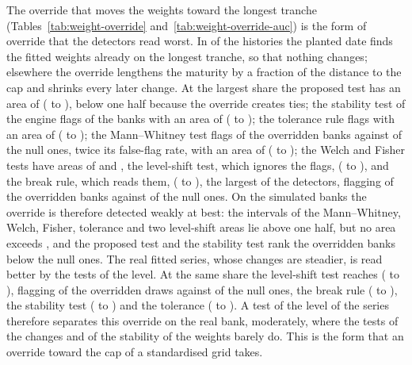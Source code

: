The override that moves the weights toward the longest tranche (Tables~\ref{tab:weight-override} and~\ref{tab:weight-override-auc}) is the form of override that the detectors read worst. In \invisShare{} of the histories the planted date finds the fitted weights already on the longest tranche, so that nothing changes; elsewhere the override lengthens the maturity by a fraction of the distance to the cap and shrinks every later change. At the largest share the proposed test has an area of \wEngineAucHigh{} (\wEngineAucLoHigh{} to \wEngineAucHiHigh{}), below one half because the override creates ties; the stability test of the engine flags \wStabFlagHigh{} of the banks with an area of \wStabAucHigh{} (\wStabAucLoHigh{} to \wStabAucHiHigh{}); the tolerance rule flags \wTolFlagHigh{} with an area of \wTolAucHigh{} (\wTolAucLoHigh{} to \wTolAucHiHigh{}); the Mann--Whitney test flags \wMwFlagHigh{} of the overridden banks against \fitNullMw{} of the null ones, twice its false-flag rate, with an area of \wMwAucHigh{} (\wMwAucLoHigh{} to \wMwAucHiHigh{}); the Welch and Fisher tests have areas of \wWelchAucHigh{} and \wFisherAucHigh{}, the level-shift test, which ignores the flags, \wShiftAucHigh{} (\wShiftAucLoHigh{} to \wShiftAucHiHigh{}), and the break rule, which reads them, \wTopAuc{} (\wTopAucLo{} to \wTopAucHi{}), the largest of the detectors, flagging \wTopFlag{} of the overridden banks against \wTopNull{} of the null ones. On the simulated banks the override is therefore detected weakly at best: the intervals of the Mann--Whitney, Welch, Fisher, tolerance and two level-shift areas lie above one half, but no area exceeds \wTopAuc{}, and the proposed test and the stability test rank the overridden banks below the null ones. The real fitted series, whose changes are steadier, is read better by the tests of the level. At the same share the level-shift test reaches \wRealTopAuc{} (\realWAucLoShift{} to \realWAucHiShift{}), flagging \wRealTopFlag{} of the overridden draws against \wRealTopNull{} of the null ones, the break rule \realWAucShiftB{} (\realWAucLoShiftB{} to \realWAucHiShiftB{}), the stability test \realWAucStab{} (\realWAucLoStab{} to \realWAucHiStab{}) and the tolerance \realWAucTol{} (\realWAucLoTol{} to \realWAucHiTol{}). A test of the level of the series therefore separates this override on the real bank, moderately, where the tests of the changes and of the stability of the weights barely do. This is the form that an override toward the cap of a standardised grid takes.



